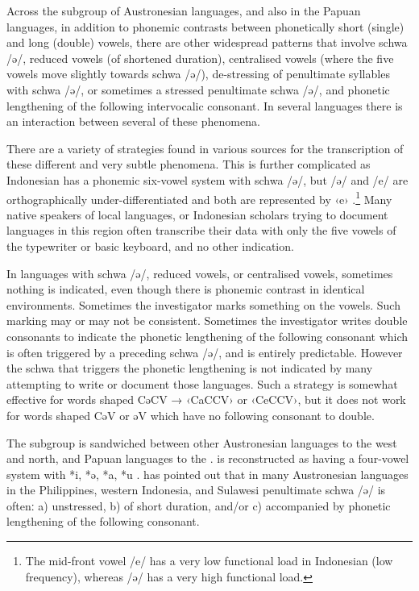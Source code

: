 Across the  subgroup of Austronesian languages,
and also in the Papuan  languages,
in addition to phonemic contrasts between phonetically short
(single) and long (double) vowels,
there are other widespread patterns that involve schwa /ə/,
reduced vowels (of shortened duration),
centralised vowels (where the five vowels move slightly towards
schwa /ə/), de-stressing of penultimate syllables with schwa /ə/,
or sometimes a stressed penultimate schwa /ə/,
and phonetic lengthening of the following intervocalic consonant.
In several languages there is an interaction between several of these phenomena.

There are a variety of strategies found in various sources
for the transcription of these different and very subtle phenomena.
This is further complicated as Indonesian has a phonemic
six-vowel system with schwa /ə/,
but /ə/ and /e/ are orthographically
under-differentiated and both are represented by ‹e›
\citep{Grimes1996}.\footnote{
		The mid-front vowel /e/ has a very low functional load in Indonesian
		(low frequency), whereas /ə/ has a very high functional load.}
Many native speakers
of local languages, or Indonesian scholars
trying to document languages
in this region often transcribe their data with only the five
vowels of the typewriter or basic keyboard,
and no other indication.

In languages with schwa /ə/,
reduced vowels, or centralised vowels, sometimes nothing is indicated,
even though there is phonemic contrast in identical environments.
Sometimes the investigator marks something on the vowels.
Such marking may or may not be consistent.
Sometimes the investigator writes double consonants to indicate
the phonetic lengthening of the following consonant which is
often triggered by a preceding schwa /ə/,
and is entirely predictable.
However the schwa that triggers the phonetic lengthening is not
indicated by many attempting to write or document those languages.
Such a strategy is somewhat effective for words shaped CəCV → ‹CaCCV›
or ‹CeCCV›, but it does not work for words shaped CəV or əV which have no
following consonant to double.

The  subgroup is sandwiched between other Austronesian
languages to the west
and north, and Papuan  languages to the .
 is reconstructed as having a four-vowel system with
*i, *ə, *a, *u \citep[173]{Blust2013}.
\citet{Smith2021} has pointed out that in many Austronesian languages
in the Philippines, western Indonesia, and Sulawesi penultimate schwa /ə/ is oftenː
a) unstressed, b) of short duration,
and/or c) accompanied by phonetic lengthening
of the following consonant.

